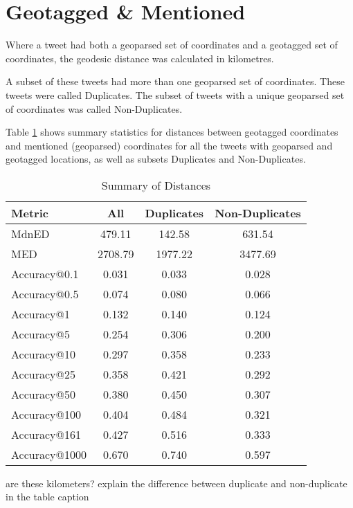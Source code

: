 \pagebreak
\section{Geotagged \& Mentioned}

Where a tweet had both a geoparsed set of coordinates and a geotagged set of coordinates, the geodesic distance was calculated in kilometres.

A subset of these tweets had more than one geoparsed set of coordinates. These tweets were called Duplicates. The subset of tweets with a unique geoparsed set of coordinates was called Non-Duplicates. 

Table \ref{table:summary-distances} shows summary statistics for distances between geotagged coordinates and mentioned (geoparsed) coordinates for all the tweets with geoparsed and geotagged locations, as well as subsets Duplicates and Non-Duplicates.

\begin{table}[H]
    \centering
    \begin{tabular}{|l|c|c|c|}
    \hline
    Metric & All & Duplicates & Non-Duplicates \\
    \hline
    MdnED & 479.11 & 142.58 & 631.54 \\
    MED & 2708.79 & 1977.22 & 3477.69 \\
    Accuracy@0.1 & 0.031 & 0.033 & 0.028 \\
    Accuracy@0.5 & 0.074 & 0.080 & 0.066 \\
    Accuracy@1 & 0.132 & 0.140 & 0.124 \\
    Accuracy@5 & 0.254 & 0.306 & 0.200 \\
    Accuracy@10 & 0.297 & 0.358 & 0.233 \\
    Accuracy@25 & 0.358 & 0.421 & 0.292 \\
    Accuracy@50 & 0.380 & 0.450 & 0.307 \\
    Accuracy@100 & 0.404 & 0.484 & 0.321 \\
    Accuracy@161 & 0.427 & 0.516 & 0.333 \\
    Accuracy@1000 & 0.670 & 0.740 & 0.597 \\
    \hline
    \end{tabular}
    \caption{Summary of Distances}
    \label{table:summary-distances}
\end{table}



are these kilometers? explain the difference between duplicate and non-duplicate in the table caption

